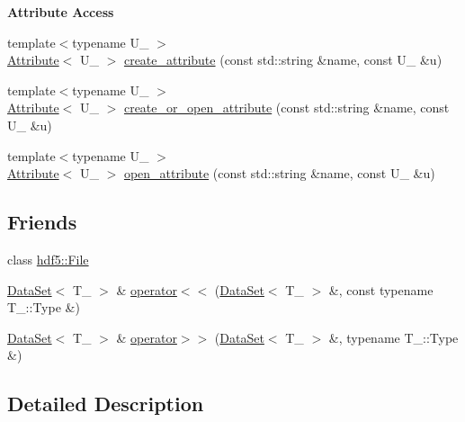 \begin{Indent}{\bf Attribute Access}\par
{\em \label{_amgrpfd46b49f54af724e1401b4f68b54ea4c}
 }\begin{DoxyCompactItemize}
\item 
{\footnotesize template$<$typename U\_\- $>$ }\\\hyperlink{classeos_1_1hdf5_1_1Attribute}{Attribute}$<$ U\_\- $>$ \hyperlink{classeos_1_1hdf5_1_1DataSet_a6004d70d8d014855457e4bb67f28e2ef}{create\_\-attribute} (const std::string \&name, const U\_\- \&u)
\item 
{\footnotesize template$<$typename U\_\- $>$ }\\\hyperlink{classeos_1_1hdf5_1_1Attribute}{Attribute}$<$ U\_\- $>$ \hyperlink{classeos_1_1hdf5_1_1DataSet_a98ac1430685d57b7de065aed4f6a874a}{create\_\-or\_\-open\_\-attribute} (const std::string \&name, const U\_\- \&u)
\item 
{\footnotesize template$<$typename U\_\- $>$ }\\\hyperlink{classeos_1_1hdf5_1_1Attribute}{Attribute}$<$ U\_\- $>$ \hyperlink{classeos_1_1hdf5_1_1DataSet_ac904229b8a8e111889535507a62652c9}{open\_\-attribute} (const std::string \&name, const U\_\- \&u)
\end{DoxyCompactItemize}
\end{Indent}
\subsection*{Friends}
\begin{DoxyCompactItemize}
\item 
class \hyperlink{classeos_1_1hdf5_1_1DataSet_a19bee9643036cfb3f6908fb332e14f27}{hdf5::File}
\item 
\hyperlink{classeos_1_1hdf5_1_1DataSet}{DataSet}$<$ T\_\- $>$ \& \hyperlink{classeos_1_1hdf5_1_1DataSet_adaf39b7e1ded5e8b0b8c5a256b7cff8a}{operator$<$$<$} (\hyperlink{classeos_1_1hdf5_1_1DataSet}{DataSet}$<$ T\_\- $>$ \&, const typename T\_\-::Type \&)
\item 
\hyperlink{classeos_1_1hdf5_1_1DataSet}{DataSet}$<$ T\_\- $>$ \& \hyperlink{classeos_1_1hdf5_1_1DataSet_ab6a61cb7ace6043e703b61ba382dfbec}{operator$>$$>$} (\hyperlink{classeos_1_1hdf5_1_1DataSet}{DataSet}$<$ T\_\- $>$ \&, typename T\_\-::Type \&)
\end{DoxyCompactItemize}


\subsection{Detailed Description}
